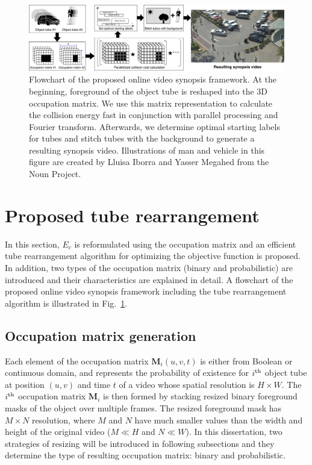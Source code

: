 \documentclass[11pt]{hyu_thesis}
\begin{document}
\begin{figure}
\includegraphics[width=\linewidth]{flowchart.pdf}
\caption{Flowchart of the proposed online video synopsis framework. At the beginning, foreground of the object tube is reshaped into the 3D occupation matrix. We use this matrix representation to calculate the collision energy fast in conjunction with parallel processing and Fourier transform. Afterwards, we determine optimal starting labels for tubes and stitch tubes with the background to generate a resulting synopsis video. Illustrations of man and vehicle in this figure are created by Lluisa Iborra and Yasser Megahed from the Noun Project.}
\label{fig:flowchart}
\end{figure}

\section{Proposed tube rearrangement}
\label{sec:proposed}
In this section, $E_c$ is reformulated using the occupation matrix and an efficient tube rearrangement algorithm for optimizing the objective function is proposed. In addition, two types of the occupation matrix (binary and probabilistic) are introduced and their characteristics are explained in detail. A flowchart of the proposed online video synopsis framework including the tube rearrangement algorithm is illustrated in Fig.~\ref{fig:flowchart}.

\subsection{Occupation matrix generation}
\label{sec:proposed:occ}
Each element of the occupation matrix $\textbf{M}_i (u,v,t)$ is either from Boolean or continuous domain, and represents the probability of existence for $i^{\rm{th}}$ object tube at position $(u,v)$ and time $t$ of a video whose spatial resolution is $H \times W$. The $i^{\rm{th}}$ occupation matrix $\textbf{M}_i$ is then formed by stacking resized binary foreground masks of the object over multiple frames. The resized foreground mask has $M \times N$ resolution, where $M$ and $N$ have much smaller values than the width and height of the original video ($M \ll H$ and $N \ll W$). In this dissertation, two strategies of resizing will be introduced in following subsections and they determine the type of resulting occupation matrix: binary and probabilistic.
\end{document}
